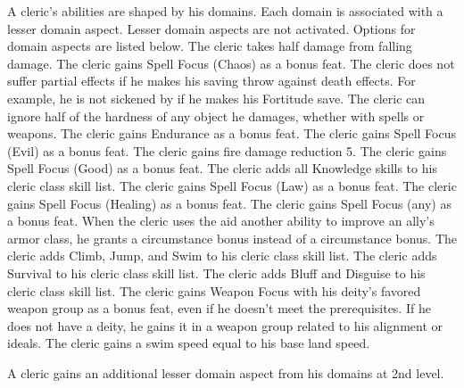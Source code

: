  A cleric's abilities are shaped by his domains. Each domain is associated with a lesser domain aspect. Lesser domain aspects are not activated. Options for domain aspects are listed below.
 The cleric takes half damage from falling damage.
 The cleric gains Spell Focus (Chaos) as a bonus feat.
 The cleric does not suffer partial effects if he makes his saving throw against death effects. For example, he is not sickened by  if he makes his Fortitude save.
 The cleric can ignore half of the hardness of any object he damages, whether with spells or weapons.
 The cleric gains Endurance as a bonus feat.
 The cleric gains Spell Focus (Evil) as a bonus feat.
 The cleric gains fire damage reduction 5.
 The cleric gains Spell Focus (Good) as a bonus feat.
 The cleric adds all Knowledge skills to his cleric class skill list.
 The cleric gains Spell Focus (Law) as a bonus feat.
 The cleric gains Spell Focus (Healing) as a bonus feat.
 The cleric gains Spell Focus (any) as a bonus feat.
 When the cleric uses the aid another ability to improve an ally's armor class, he grants a  circumstance bonus instead of a  circumstance bonus.
 The cleric adds Climb, Jump, and Swim to his cleric class skill list.
 The cleric adds Survival to his cleric class skill list.
 The cleric adds Bluff and Disguise to his cleric class skill list.
 The cleric gains Weapon Focus with his deity's favored weapon group as a bonus feat, even if he doesn't meet the prerequisites. If he does not have a deity, he gains it in a weapon group related to his alignment or ideals.
 The cleric gains a swim speed equal to his base land speed.

A cleric gains an additional lesser domain aspect from his domains at 2nd level.

